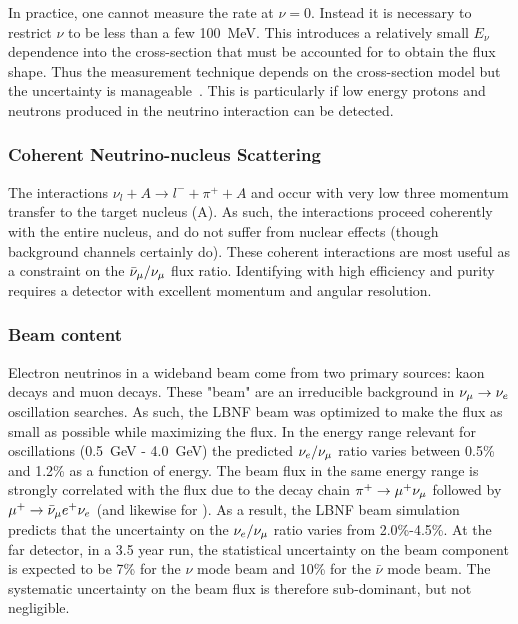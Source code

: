 In practice, one cannot measure the rate at $\nu=0$. Instead it is necessary to restrict $\nu$ to be less than a few \SI{100}{MeV}.  This introduces a relatively small $E_\nu$ dependence into the cross-section that must be accounted for to obtain the flux shape. Thus the  measurement technique depends on the cross-section model but the uncertainty is manageable~\cite{bib:bodek_lownu}. This is particularly if low energy protons and neutrons produced in the neutrino interaction can be detected. 

\subsubsection{Coherent Neutrino-nucleus Scattering}
The interactions $\nu_l + A \rightarrow l^- + \pi^+ + A$ and 
occur with very low three momentum transfer to the target nucleus (A). As such, the interactions proceed coherently with the entire nucleus, and do not suffer from nuclear effects (though background channels certainly do). These coherent interactions are most useful as a constraint on the $\bar\nu_\mu/\nu_\mu$ flux ratio. Identifying with high efficiency and purity requires a detector with excellent momentum and angular resolution.

\subsubsection{Beam \nue content}

Electron neutrinos in a wideband beam come from two primary sources: kaon decays and muon decays. These "beam" \nue are an irreducible background in $\nu_\mu \to \nu_e$ oscillation searches. As such, the LBNF beam was optimized to make the \nue flux as small as possible while maximizing the \numu flux. In the energy range relevant for oscillations (\SI{0.5}{GeV} - \SI{4.0}{GeV}) the predicted $\nu_e/\nu_\mu$ ratio varies between 0.5\% and 1.2\% as a function of energy. The beam \nue flux in the same energy range is strongly correlated with the \numu flux due to the decay chain $\pi^+\to\mu^+\nu_\mu$ followed by $\mu^+ \to \bar\nu_\mu{} e^+ \nu_e $ (and likewise for \anue). As a result, the LBNF beam simulation predicts that the uncertainty on the $\nu_e/\nu_\mu$ ratio varies from 2.0\%-4.5\%. At the far detector, in a 3.5 year run, the statistical uncertainty on the beam \nue component is expected to be 7\% for the $\nu$ mode beam and 10\% for the $\bar{\nu}$ mode beam. The systematic uncertainty on the beam \nue flux is therefore sub-dominant, but not negligible.  







